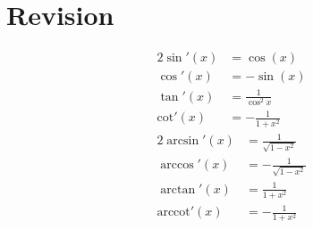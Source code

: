 \chapter{Revision}

    \begin{alignat*}{2}
      \sin'(x) &= \cos(x) \\
      \cos'(x) &= -\sin(x) \\
      \tan'(x) &= \frac{1}{\cos^{2}x} \\
      \mbox{cot}'(x) &= - \frac{1}{1 + x^{2}}
    \end{alignat*}
    \begin{alignat*}{2}
      \arcsin'(x) &= \frac{1}{\sqrt{1 - x^{2}}} \\
      \arccos'(x) &= - \frac{1}{\sqrt{1 - x^{2}}} \\
      \arctan'(x) &= \frac{1}{1 + x^{2}} \\
      \mbox{arccot}'(x) &= - \frac{1}{1 + x^{2}}
    \end{alignat*}
